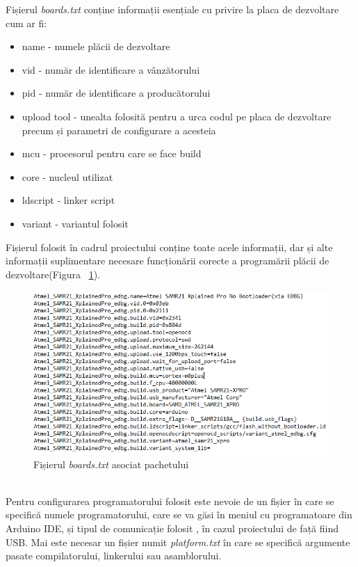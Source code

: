 \documentclass[12pt,a4paper]{report}
\begin{document}
Fișierul \textit{boards.txt} conține informații esențiale cu privire la placa de dezvoltare cum ar fi:
\begin{itemize}
	\item{name - numele plăcii de dezvoltare}
	\item{vid - număr de identificare a vânzătorului}
	\item{pid - număr de identificare a producătorului}
	\item{upload tool - unealta folosită pentru a urca codul pe placa de dezvoltare precum și parametri de configurare a acesteia} 
	\item{mcu - procesorul pentru care se face build}
	\item{core - nucleul utilizat}
	\item{ldscript - linker script}
	\item{variant - variantul folosit}
\end{itemize}
Fișierul folosit în cadrul proiectului conține toate acele informații, dar și alte informații suplimentare necesare funcționării corecte a programării plăcii de dezvoltare(Figura ~\ref{fig:boards}).
\begin{figure}[h]
\centering
\includegraphics[scale=0.7]{pics/boards.png}
  \caption{Fișierul \textit{boards.txt} asociat pachetului}
  \label{fig:boards}
\end{figure}\\
Pentru configurarea programatorului folosit este nevoie de un fișier în care se specifică numele programatorului, care se va găsi în meniul cu programatoare din Arduino IDE, și tipul de comunicație folosit , în cazul proiectului de față fiind USB. Mai este necesar un fișier numit \textit{platform.txt} în care se specifică argumente pasate compilatorului, linkerului sau asamblorului.
\end{document}
